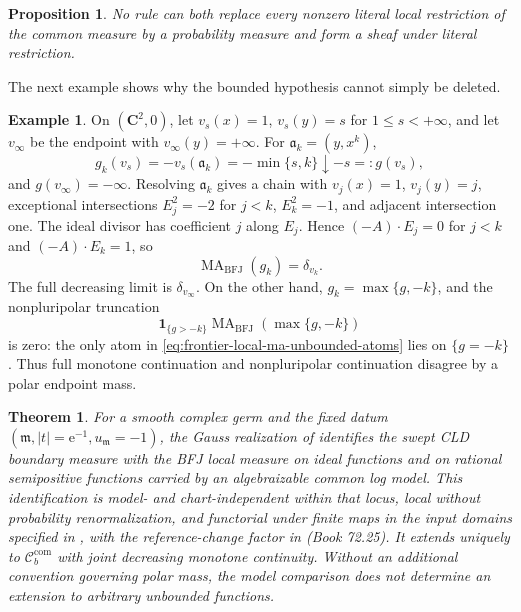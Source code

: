\documentclass[11pt,a4paper]{article}
\newtheorem{theorem}{Theorem}[section]
\newtheorem{proposition}[proposition]{Proposition}
\theoremstyle{definition}
\newtheorem{example}[example]{Example}
\theoremstyle{remark}
\newcommand{\rme}{\mathrm e}
\newcommand{\one}{\mathbf 1}
\DeclareMathOperator{\MA}{MA}
\begin{document}
\begin{proposition}\label{prop:frontier-local-ma-no-probability}
No rule can both replace every nonzero literal local restriction of the
common measure by a probability measure and form a sheaf under literal
restriction.
\end{proposition}



The next example shows why the bounded hypothesis cannot simply be deleted.

\begin{example}\label{ex:frontier-local-ma-polar-endpoint}
On \((\mathbf C^2,0)\), let
\(v_s(x)=1\), \(v_s(y)=s\) for \(1\leq s<+\infty\), and let
\(v_\infty\) be the endpoint with \(v_\infty(y)=+\infty\).  For
\(\mathfrak a_k=(y,x^k)\),
\begin{equation}
 g_k(v_s)=-v_s(\mathfrak a_k)=-\min\{s,k\}\downarrow-s=:g(v_s),
 \label{eq:frontier-local-ma-unbounded-ray}
\end{equation}
and \(g(v_\infty)=-\infty\).  Resolving \(\mathfrak a_k\) gives a chain with
\(v_j(x)=1\), \(v_j(y)=j\), exceptional intersections
\(E_j^2=-2\) for \(j<k\), \(E_k^2=-1\), and adjacent intersection one.
The ideal divisor has coefficient \(j\) along \(E_j\).  Hence
\((-A)\cdot E_j=0\) for \(j<k\) and
\((-A)\cdot E_k=1\), so
\begin{equation}
                  \MA_{\mathrm{BFJ}}(g_k)=\delta_{v_k}.
 \label{eq:frontier-local-ma-unbounded-atoms}
\end{equation}
The full decreasing limit is \(\delta_{v_\infty}\).  On the other hand,
\(g_k=\max\{g,-k\}\), and the nonpluripolar truncation
\[
 \one_{\{g>-k\}}\MA_{\mathrm{BFJ}}(\max\{g,-k\})
\]
is zero: the only atom in
\eqref{eq:frontier-local-ma-unbounded-atoms} lies on \(\{g=-k\}\).  Thus
full monotone continuation and nonpluripolar continuation disagree by a
polar endpoint mass.
\end{example}

\begin{theorem}\label{thm:frontier-common-local-ma}
For a smooth complex germ and the fixed datum
\((\mathfrak m,|t|=\rme^{-1},u_{\mathfrak m}=-1)\), the Gauss realization
of  identifies the swept CLD boundary
measure with the BFJ local measure on ideal functions and on rational
semipositive functions carried by an algebraizable common log model.  This
identification is model- and chart-independent within that locus, local
without probability renormalization, and functorial under finite maps in the
input domains specified in , with the
reference-change factor in \textup{(Book 72.25)}.
It extends uniquely to
\(\mathcal C_b^{\mathrm{com}}\) with joint decreasing monotone continuity.
Without an additional convention governing polar mass, the model comparison
does not determine an extension to arbitrary unbounded functions.
\end{theorem}
\end{document}
